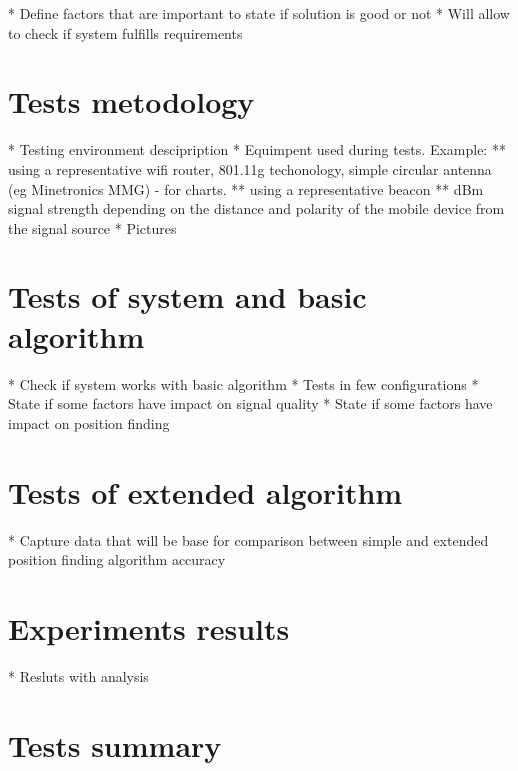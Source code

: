 \documentclass[../main.tex]{subfiles}
\begin{document}
* Define factors that are important to state if solution is good or not
* Will allow to check if system fulfills requirements


\section{Tests metodology} %
\label{sec:tests_metodology}

* Testing environment descipription
* Equimpent used during tests. Example:
** using a representative wifi router, 801.11g techonology, simple circular antenna (eg Minetronics MMG) - for charts.
** using a representative beacon
** dBm signal strength depending on the distance and polarity of the mobile device from the signal source
* Pictures


\section{Tests of system and basic algorithm} %
\label{sec:tests_of_system_and_basic_algorithm}

* Check if system works with basic algorithm
* Tests in few configurations
* State if some factors have impact on signal quality
* State if some factors have impact on position finding

\section{Tests of extended algorithm} %
\label{sec:tests_of_extended_algorithm}

* Capture data that will be base for comparison between simple and extended position finding algorithm accuracy


\section{Experiments results} %
\label{sec:experiments_results}

* Resluts with analysis


\section{Tests summary} %
\label{sec:tests_summary}

\end{document}
